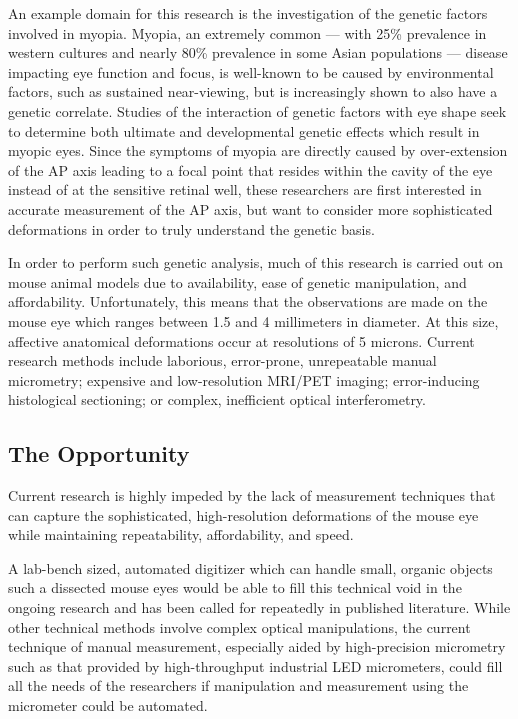 \documentclass{article}
\begin{document}
An example domain for this research is the investigation of the genetic factors involved in myopia. Myopia, an extremely common --- with 25\% prevalence in western cultures and nearly 80\% prevalence in some Asian populations\cite{rajan98} --- disease impacting eye function and focus, is well-known to be caused by environmental factors, such as sustained near-viewing, but is increasingly shown to also have a genetic correlate.\cite{zhou99:genes,zhou99:models,schmucker04} Studies of the interaction of genetic factors with eye shape seek to determine both ultimate and developmental genetic effects which result in myopic eyes. Since the symptoms of myopia are directly caused by over-extension of the AP axis leading to a focal point that resides within the cavity of the eye instead of at the sensitive retinal well, these researchers are first interested in accurate measurement of the AP axis,\cite{wallman04} but want to consider more sophisticated deformations in order to truly understand the genetic basis.\cite{schaeffel04}

In order to perform such genetic analysis, much of this research is carried out on mouse animal models due to availability, ease of genetic manipulation, and affordability.\cite{schaeffel04} Unfortunately, this means that the observations are made on the mouse eye which ranges between 1.5 and 4 millimeters in diameter. At this size, affective anatomical deformations occur at resolutions of 5 microns. Current research methods include laborious, error-prone, unrepeatable manual micrometry;\cite{wallman04} expensive and low-resolution MRI/PET imaging;\cite{atchison04} error-inducing histological sectioning;\cite{schaeffel04} or complex, inefficient optical interferometry.\cite{schaeffel04,guggenheim04}

\subsection{The Opportunity}
\label{sec:opportunity}

Current research is highly impeded by the lack of measurement
techniques that can capture the sophisticated, high-resolution
deformations of the mouse eye while
maintaining repeatability, affordability, and speed.

A lab-bench sized, automated digitizer which can handle small, organic objects such a dissected mouse eyes would be able to fill this technical void in the ongoing research and has been called for repeatedly in published literature.\cite{schaeffel04,atchison04,zhou99:genes,zhou99:models} While other technical methods involve complex optical manipulations, the current technique of manual measurement, especially aided by high-precision micrometry such as that provided by high-throughput industrial LED micrometers, could fill all the needs of the researchers if manipulation and measurement using the micrometer could be automated.
\end{document}
